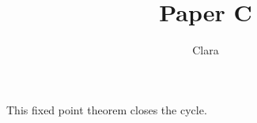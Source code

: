 \title{Paper C}\author{Clara}
\begin{theorem}\label{thm:main}
This fixed point theorem closes the cycle.
\end{theorem}
\cite{paper-a}

